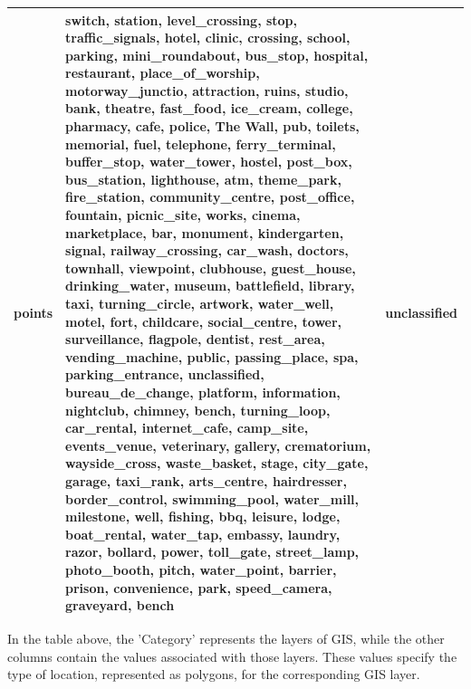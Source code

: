 \documentclass[a4paper,12pt]{Classes/RoboticsLaTeX}
\begin{document}
{\begin{longtable}{|p{2cm}|p{12cm}|p{2cm}|}
		\hline
		points & switch, station, level\_crossing, stop, traffic\_signals, hotel, clinic, crossing, school, parking, mini\_roundabout, bus\_stop, hospital, restaurant, place\_of\_worship, motorway\_junctio, attraction, ruins, studio, bank, theatre, fast\_food, ice\_cream, college, pharmacy, cafe, police, The Wall, pub, toilets, memorial, fuel, telephone, ferry\_terminal, buffer\_stop, water\_tower, hostel, post\_box, bus\_station, lighthouse, atm, theme\_park, fire\_station, community\_centre, post\_office, fountain, picnic\_site, works, cinema, marketplace, bar, monument, kindergarten, signal, railway\_crossing, car\_wash, doctors, townhall, viewpoint, clubhouse, guest\_house, drinking\_water, museum, battlefield, library, taxi, turning\_circle, artwork, water\_well, motel, fort, childcare, social\_centre, tower, surveillance, flagpole, dentist, rest\_area, vending\_machine, public, passing\_place, spa, parking\_entrance, unclassified, bureau\_de\_change, platform, information, nightclub, chimney, bench, turning\_loop, car\_rental, internet\_cafe, camp\_site, events\_venue, veterinary, gallery, crematorium, wayside\_cross, waste\_basket, stage, city\_gate, garage, taxi\_rank, arts\_centre, hairdresser, border\_control, swimming\_pool, water\_mill, milestone, well, fishing, bbq, leisure, lodge, boat\_rental, water\_tap, embassy, laundry, razor, bollard, power, toll\_gate, street\_lamp, photo\_booth, pitch, water\_point, barrier, prison, convenience, park, speed\_camera, graveyard, bench & unclassified \\
		\hline
		\end{longtable}}


		In the table above, the 'Category' represents the layers of \ac{GIS}, while the other columns contain the values associated with those layers. These values specify the type of location, represented as polygons, for the corresponding \ac{GIS} layer.
\end{document}
